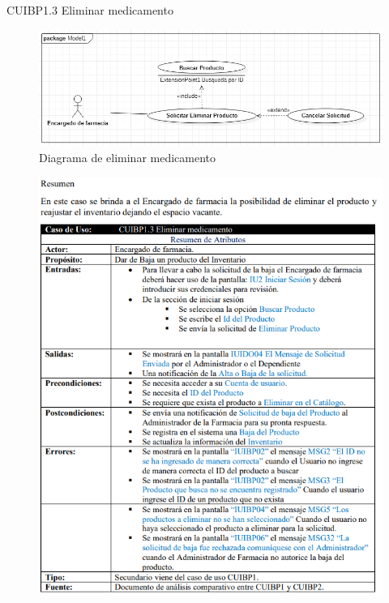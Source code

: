 \documentclass[12pt,letterpaper]{article}
\begin{document}
            \newpage
            CUIBP1.3 Eliminar medicamento 
            \begin{figure}[H]
                \centering
                \includegraphics [scale=0.45]{casosUso/eliminarMedicamento}
                \caption{Diagrama de eliminar medicamento}
            \end{figure}
            \begin{figure}[H]
                \centering
                \includegraphics [scale=0.7]{specs/specEliminarMedicamento}
            \end{figure}
\end{document}

